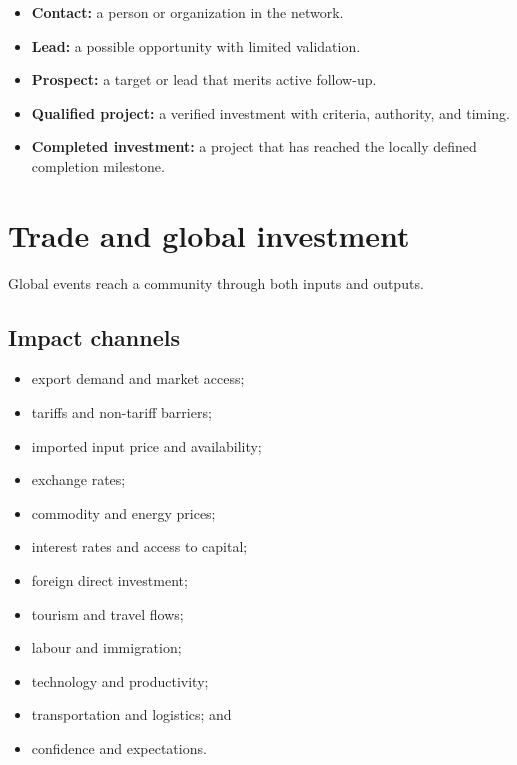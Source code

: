 \documentclass[11pt,letterpaper,oneside,openany]{book}
\begin{document}
\begin{itemize}
\item \textbf{Contact:} a person or organization in the network.
\item \textbf{Lead:} a possible opportunity with limited validation.
\item \textbf{Prospect:} a target or lead that merits active follow-up.
\item \textbf{Qualified project:} a verified investment with criteria, authority, and timing.
\item \textbf{Completed investment:} a project that has reached the locally defined completion milestone.
\end{itemize}


\section[Trade and global investment]{Trade and global investment}
Global events reach a community through both inputs and outputs.


\subsection[Impact channels]{Impact channels}
\begin{itemize}
\item export demand and market access;
\item tariffs and non-tariff barriers;
\item imported input price and availability;
\item exchange rates;
\item commodity and energy prices;
\item interest rates and access to capital;
\item foreign direct investment;
\item tourism and travel flows;
\item labour and immigration;
\item technology and productivity;
\item transportation and logistics; and
\item confidence and expectations.
\end{itemize}


\end{document}
